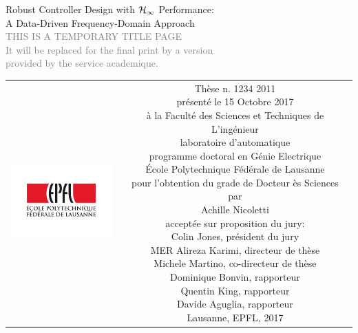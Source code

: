 \begin{titlepage}
\begin{center}
\sffamily


\null\vspace{2cm}
{\huge Robust Controller Design with $\mathcal{H}_{\infty}$ Performance: \\[12pt] A Data-Driven Frequency-Domain Approach} \\[24pt] 
\textcolor{gray}{\small{THIS IS A TEMPORARY TITLE PAGE \\ It will be replaced for the final print by a version \\ provided by the service academique.}}
    
\vfill

\begin{tabular} {cc}
\parbox{0.3\textwidth}{\includegraphics[width=4cm]{images/epfl}}
&
\parbox{0.7\textwidth}{%
	Thèse n. 1234 2011\\
	présenté le 15 Octobre 2017\\
	à la Faculté des Sciences et Techniques de L'ingénieur\\
	laboratoire d'automatique \\
	programme doctoral en Génie Electrique\\
%
	École Polytechnique Fédérale de Lausanne\\[6pt]
	pour l'obtention du grade de Docteur ès Sciences\\
	par\\ [4pt]
	\null \hspace{3em} Achille Nicoletti\\[9pt]
%
\small
acceptée sur proposition du jury:\\[4pt]
%
    Colin Jones, président du jury\\
    MER Alireza Karimi, directeur de thèse\\
    Michele Martino, co-directeur de thèse\\
    Dominique Bonvin, rapporteur\\
    Quentin King, rapporteur\\
    Davide Aguglia, rapporteur\\[12pt]
%
Lausanne, EPFL, 2017}
\end{tabular}
\end{center}
\vspace{2cm}
\end{titlepage}



